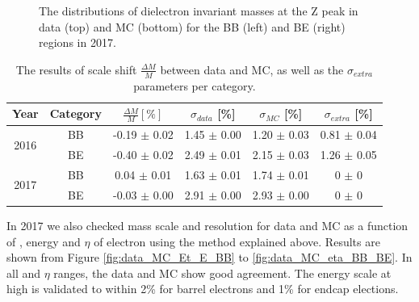 \begin{figure}[ht]
\begin{center}
\begin{tabular}{cc}
    \end{tabular}
    \caption{The distributions of dielectron invariant masses at the Z peak in data (top) and MC (bottom) for the BB (left) and BE (right) regions in 2017.
    \label{fig:data_MC_peak_2017}}
  \end{center}
\end{figure}



\begin{table}[htb]
\begin{center}
\begin{tabular}{cccccc}
\hline
Year &Category            & $\frac{\Delta M}{M} [\%]$ & $\sigma_{data}$ [\%] & $\sigma_{MC}$ [\%] & $\sigma_{extra}$ [\%] \\ \hline
\multirow{2}{*}{2016}     &BB       & -0.19 $\pm$ 0.02          & 1.45 $\pm$ 0.00      & 1.20 $\pm$ 0.03    & 0.81 $\pm$ 0.04  \\
                          &BE       & -0.40 $\pm$ 0.02          & 2.49 $\pm$ 0.01      & 2.15 $\pm$ 0.03    & 1.26 $\pm$ 0.05  \\ \hline
\multirow{2}{*}{2017}     &BB       & 0.04 $\pm$ 0.01           & 1.63 $\pm$ 0.01      & 1.74 $\pm$ 0.01    & 0 $\pm$ 0 \\
                          &BE       & -0.03 $\pm$ 0.00          & 2.91 $\pm$ 0.00      & 2.93 $\pm$ 0.00    & 0 $\pm$ 0 \\ \hline
\end{tabular}
\caption{The results of scale shift $\frac{\Delta M}{M}$  between data and MC, as well as the $\sigma_{extra}$ parameters per category. \label{tab:extra}}
\end{center}
\end{table}
\medskip


In 2017 we also checked mass scale and resolution for data and MC as a function of \et, energy and $\eta$ of electron using the method explained above.
Results are shown from Figure \ref{fig:data_MC_Et_E_BB} to \ref{fig:data_MC_eta_BB_BE}. In all \et and  $\eta$ ranges, the data and MC show good agreement.
The energy scale at high \et is validated to within 2\% for barrel electrons and 1\% for endcap elections.

